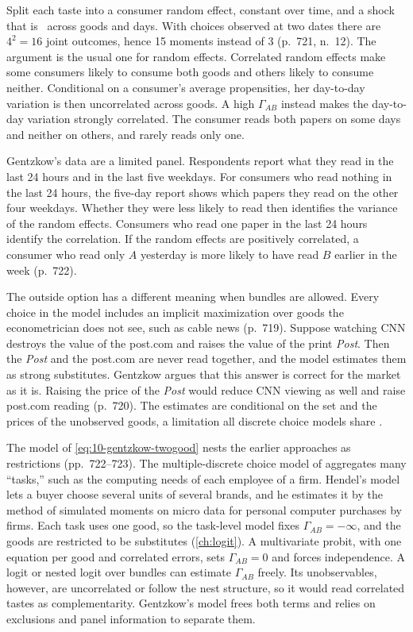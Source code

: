  Split each taste into a consumer random effect, constant over time, and a shock that is \iid\
across goods and days. With choices observed at two dates there are $4^2 = 16$ joint outcomes, hence 15 moments
instead of 3 (p.~721, n.~12). The argument is the usual one for random effects. Correlated random effects make some
consumers likely to consume both goods and others likely to consume neither. Conditional on a consumer's average
propensities, her day-to-day variation is then uncorrelated across goods. A high $\Gamma_{AB}$ instead makes the
day-to-day variation strongly correlated. The consumer reads both papers on some days and neither on others, and
rarely reads only one.

Gentzkow's data are a limited panel. Respondents report what they read in the last 24 hours and in the last five
weekdays. For consumers who read nothing in the last 24 hours, the five-day report shows which papers they read on
the other four weekdays. Whether they
were less likely to read then identifies the variance of the random effects. Consumers who read one paper in the last
24 hours identify the correlation. If the random effects are positively correlated, a consumer who read only $A$
yesterday is more likely to have read $B$ earlier in the week (p.~722).

 The outside option has a different meaning when bundles are allowed. Every choice in the
model includes an implicit maximization over goods the econometrician does not see, such as cable news (p.~719).
Suppose watching CNN destroys the value of the post.com and raises the value of the print \textit{Post}. Then the
\textit{Post} and the post.com are never read together, and the model estimates them as strong substitutes. Gentzkow
argues that this answer is correct for the market as it is. Raising the price of the \textit{Post} would reduce CNN
viewing as well and raise post.com reading (p.~720). The estimates are conditional on the set and the prices of the
unobserved goods, a limitation all discrete choice models share \citep{Samuelson1974}.

 The model of \eqref{eq:10-gentzkow-twogood} nests the earlier approaches as restrictions
(pp.~722--723). The multiple-discrete choice model of \citet{Hendel1999} aggregates many ``tasks,'' such as the
computing needs of each employee of a firm. Hendel's model lets a buyer choose several units of several brands, and he
estimates it by the method of simulated moments on micro data for personal computer purchases by firms. Each task uses
one good, so the task-level model fixes $\Gamma_{AB} = -\infty$, and the goods are restricted to be substitutes
(\cref{ch:logit}). A multivariate probit, with one equation per good and correlated errors, sets $\Gamma_{AB} = 0$
and forces independence. A logit or nested logit over bundles \citep{ManskiSherman1980,TrainMcFaddenBenAkiva1987} can
estimate $\Gamma_{AB}$ freely. Its unobservables, however, are uncorrelated or follow the nest structure, so it would
read correlated tastes as complementarity. Gentzkow's model frees both terms and relies on exclusions and panel
information to separate them.

